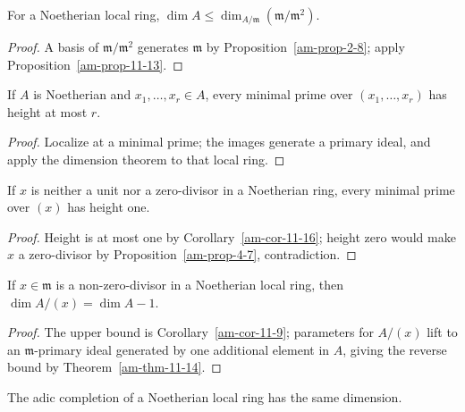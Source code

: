 \begin{corollary}
\label{am-cor-11-15}
\uses{}
For a Noetherian local ring, $\dim A\le\dim_{A/\mathfrak{m}}(\mathfrak{m}/\mathfrak{m}^2)$.
\end{corollary}
\begin{proof}
A basis of $\mathfrak{m}/\mathfrak{m}^2$ generates $\mathfrak{m}$ by Proposition~\ref{am-prop-2-8}; apply
Proposition~\ref{am-prop-11-13}.
\end{proof}
\begin{corollary}
\label{am-cor-11-16}
\uses{}
If $A$ is Noetherian and $x_1,\ldots,x_r\in A$, every minimal prime over
$(x_1,\ldots,x_r)$ has height at most $r$.
\end{corollary}
\begin{proof}
Localize at a minimal prime; the images generate a primary ideal, and apply the
dimension theorem to that local ring.
\end{proof}
\begin{corollary}
\label{am-cor-11-17}
\uses{}
If $x$ is neither a unit nor a zero-divisor in a Noetherian ring, every minimal
prime over $(x)$ has height one.
\end{corollary}
\begin{proof}
Height is at most one by Corollary~\ref{am-cor-11-16}; height zero would make
$x$ a zero-divisor by Proposition~\ref{am-prop-4-7}, contradiction.
\end{proof}
\begin{corollary}
\label{am-cor-11-18}
\uses{}
If $x\in\mathfrak{m}$ is a non-zero-divisor in a Noetherian local ring, then
$\dim A/(x)=\dim A-1$.
\end{corollary}
\begin{proof}
The upper bound is Corollary~\ref{am-cor-11-9}; parameters for $A/(x)$ lift
to an $\mathfrak{m}$-primary ideal generated by one additional element in $A$, giving
the reverse bound by Theorem~\ref{am-thm-11-14}.
\end{proof}
\begin{corollary}
\label{am-cor-11-19}
\uses{}
The adic completion of a Noetherian local ring has the same dimension.
\end{corollary}
